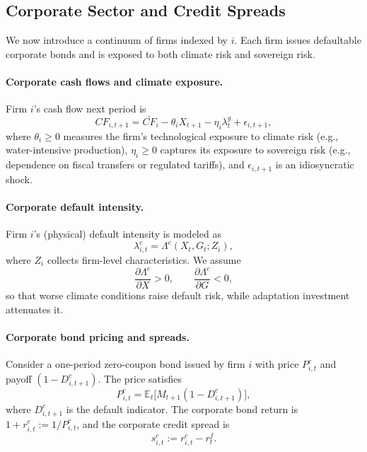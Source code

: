 \documentclass[12pt]{article}
\def\E{\mathbb{E}}
\begin{document}
\subsection{Corporate Sector and Credit Spreads}

We now introduce a continuum of firms indexed by $i$. Each firm issues
defaultable corporate bonds and is exposed to both climate risk and
sovereign risk.

\paragraph{Corporate cash flows and climate exposure.}
Firm $i$'s cash flow next period is
\begin{equation}
  CF_{i,t+1} = \bar{CF}_i - \theta_i X_{t+1} - \eta_i \lambda^g_t + \epsilon_{i,t+1},
  \label{eq:CF}
\end{equation}
where $\theta_i \ge 0$ measures the firm's technological exposure to
climate risk (e.g., water-intensive production), $\eta_i \ge 0$ captures
its exposure to sovereign risk (e.g., dependence on fiscal transfers or
regulated tariffs), and $\epsilon_{i,t+1}$ is an idiosyncratic shock.

\paragraph{Corporate default intensity.}
Firm $i$'s (physical) default intensity is modeled as
\begin{equation}
  \lambda^c_{i,t} = \Lambda^c(X_t, G_t; Z_i),
  \label{eq:lambda_c_def}
\end{equation}
where $Z_i$ collects firm-level characteristics. We assume
\begin{equation}
  \frac{\partial \Lambda^c}{\partial X} > 0, 
  \qquad
  \frac{\partial \Lambda^c}{\partial G} < 0,
  \label{eq:lambda_c_mono}
\end{equation}
so that worse climate conditions raise default risk, while adaptation
investment attenuates it.

\paragraph{Corporate bond pricing and spreads.}
Consider a one-period zero-coupon bond issued by firm $i$ with price
$P^c_{i,t}$ and payoff $(1-D^c_{i,t+1})$. The price satisfies
\begin{equation}
  P^c_{i,t} = \E_t\Big[M_{t+1} (1 - D^c_{i,t+1})\Big],
  \label{eq:corp_bond_price}
\end{equation}
where $D^c_{i,t+1}$ is the default indicator. The corporate bond return is
$1 + r^c_{i,t} := 1/P^c_{i,t}$, and the corporate credit spread is
\begin{equation}
  s^c_{i,t} := r^c_{i,t} - r^f_t.
  \label{eq:sc_def}
\end{equation}
\end{document}
